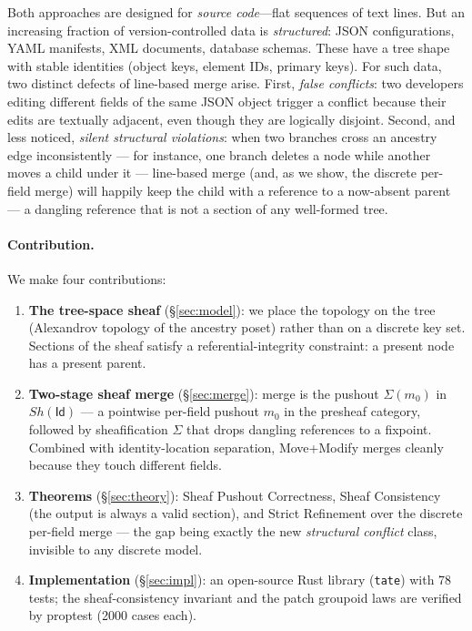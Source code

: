\documentclass[11pt,a4paper]{article}
\newcommand{\Id}{\mathsf{Id}}
\begin{document}
Both approaches are designed for \emph{source code}---flat sequences of
text lines. But an increasing fraction of version-controlled data is
\emph{structured}: JSON configurations, YAML manifests, XML documents,
database schemas. These have a tree shape with stable identities (object
keys, element IDs, primary keys). For such data, two distinct defects of
line-based merge arise. First, \emph{false conflicts}: two developers
editing different fields of the same JSON object trigger a conflict
because their edits are textually adjacent, even though they are logically
disjoint. Second, and less noticed, \emph{silent structural violations}:
when two branches cross an ancestry edge inconsistently --- for instance,
one branch deletes a node while another moves a child under it ---
line-based merge (and, as we show, the discrete per-field merge) will
happily keep the child with a reference to a now-absent parent --- a
dangling reference that is not a section of any well-formed tree.

\paragraph{Contribution.}
We make four contributions:

\begin{enumerate}[noitemsep]
\item \textbf{The tree-space sheaf} (\S\ref{sec:model}): we place the
topology on the tree (Alexandrov topology of the ancestry poset) rather
than on a discrete key set. Sections of the sheaf satisfy a
referential-integrity constraint: a present node has a present parent.

\item \textbf{Two-stage sheaf merge} (\S\ref{sec:merge}): merge is the
pushout $\Sigma(m_0)$ in $Sh(\Id)$ --- a pointwise per-field pushout $m_0$
in the presheaf category, followed by sheafification $\Sigma$ that drops
dangling references to a fixpoint. Combined with identity-location
separation, Move+Modify merges cleanly because they touch different fields.

\item \textbf{Theorems} (\S\ref{sec:theory}): Sheaf Pushout Correctness,
Sheaf Consistency (the output is always a valid section), and Strict
Refinement over the discrete per-field merge --- the gap being exactly the
new \emph{structural conflict} class, invisible to any discrete model.

\item \textbf{Implementation} (\S\ref{sec:impl}): an open-source Rust
library (\texttt{tate}) with 78 tests; the sheaf-consistency invariant
and the patch groupoid laws are verified by proptest (2000 cases each).
\end{enumerate}
\end{document}
